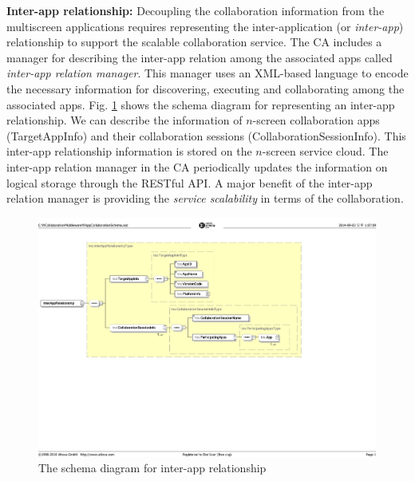\documentclass[conference]{IEEEtran}
\begin{document}
\noindent
\textbf{Inter-app relationship:}
Decoupling the collaboration information from the multiscreen applications requires representing the inter-application (or \textit{inter-app}) relationship to support the scalable collaboration service. The CA includes a manager for describing the inter-app relation among the associated apps called \textit{inter-app relation manager}. This manager uses an XML-based language to encode the necessary information for discovering, executing and collaborating among the associated apps. 
Fig. \ref{fig:interapprelation} shows the schema diagram for representing an inter-app relationship. We can describe the information of $n$-screen collaboration apps (TargetAppInfo) and their collaboration sessions (CollaborationSessionInfo).
This inter-app relationship information is stored on the $n$-screen service cloud. The inter-app relation manager in the CA periodically updates the information on logical storage through the RESTful API.
A major benefit of the inter-app relation manager is providing the \textit{service scalability} in terms of the collaboration.

\begin{figure}[htb] %
\centering
\includegraphics[width=13cm,keepaspectratio]{interapprelation}
\caption{The schema diagram for inter-app relationship}
\label{fig:interapprelation}
\end{figure}
\end{document}
